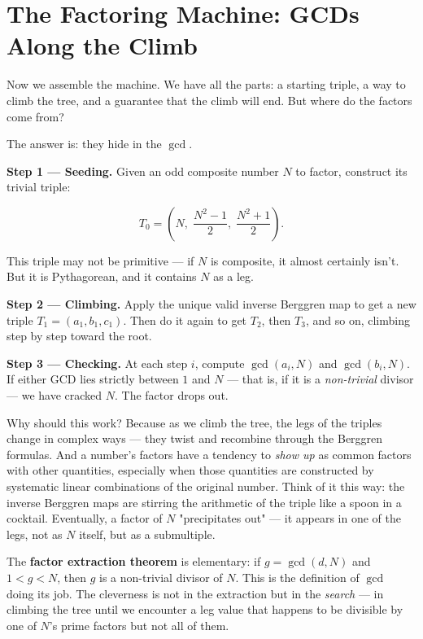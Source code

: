 \bigskip

\section*{The Factoring Machine: GCDs Along the Climb}

Now we assemble the machine. We have all the parts: a starting triple, a way to climb the tree, and a guarantee that the climb will end. But where do the factors come from?

The answer is: they hide in the $\gcd$.

\textbf{Step 1 --- Seeding.} Given an odd composite number $N$ to factor, construct its trivial triple:

\[
T_0 = \left(N,\;\frac{N^2 - 1}{2},\;\frac{N^2 + 1}{2}\right).
\]

This triple may not be primitive --- if $N$ is composite, it almost certainly isn't. But it is Pythagorean, and it contains $N$ as a leg.

\textbf{Step 2 --- Climbing.} Apply the unique valid inverse Berggren map to get a new triple $T_1 = (a_1, b_1, c_1)$. Then do it again to get $T_2$, then $T_3$, and so on, climbing step by step toward the root.

\textbf{Step 3 --- Checking.} At each step $i$, compute $\gcd(a_i, N)$ and $\gcd(b_i, N)$. If either GCD lies strictly between $1$ and $N$ --- that is, if it is a \textit{non-trivial} divisor --- we have cracked $N$. The factor drops out.

Why should this work? Because as we climb the tree, the legs of the triples change in complex ways --- they twist and recombine through the Berggren formulas. And a number's factors have a tendency to \textit{show up} as common factors with other quantities, especially when those quantities are constructed by systematic linear combinations of the original number. Think of it this way: the inverse Berggren maps are stirring the arithmetic of the triple like a spoon in a cocktail. Eventually, a factor of $N$ "precipitates out" --- it appears in one of the legs, not as $N$ itself, but as a submultiple.

The \textbf{factor extraction theorem} is elementary: if $g = \gcd(d, N)$ and $1 < g < N$, then $g$ is a non-trivial divisor of $N$. This is the definition of $\gcd$ doing its job. The cleverness is not in the extraction but in the \textit{search} --- in climbing the tree until we encounter a leg value that happens to be divisible by one of $N$'s prime factors but not all of them.

